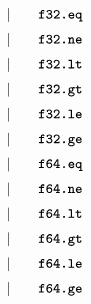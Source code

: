 \begin{alignat*}{9}
    &&       &&\quad | &\quad && \textbf{\texttt{f32.eq}} \quad &&  \\[1mm]
    &&       &&\quad | &\quad && \textbf{\texttt{f32.ne}} \quad &&  \\[1mm]
    &&       &&\quad | &\quad && \textbf{\texttt{f32.lt}} \quad &&  \\[1mm]
    &&       &&\quad | &\quad && \textbf{\texttt{f32.gt}} \quad &&  \\[1mm]
    &&       &&\quad | &\quad && \textbf{\texttt{f32.le}} \quad &&  \\[1mm]
    &&       &&\quad | &\quad && \textbf{\texttt{f32.ge}} \quad &&  \\[1mm]
    &&       &&\quad | &\quad && \textbf{\texttt{f64.eq}} \quad &&  \\[1mm]
    &&       &&\quad | &\quad && \textbf{\texttt{f64.ne}} \quad &&  \\[1mm]
    &&       &&\quad | &\quad && \textbf{\texttt{f64.lt}} \quad &&  \\[1mm]
    &&       &&\quad | &\quad && \textbf{\texttt{f64.gt}} \quad &&  \\[1mm]
    &&       &&\quad | &\quad && \textbf{\texttt{f64.le}} \quad &&  \\[1mm]
    &&       &&\quad | &\quad && \textbf{\texttt{f64.ge}} \quad &&  \\[1mm]
\end{alignat*}


